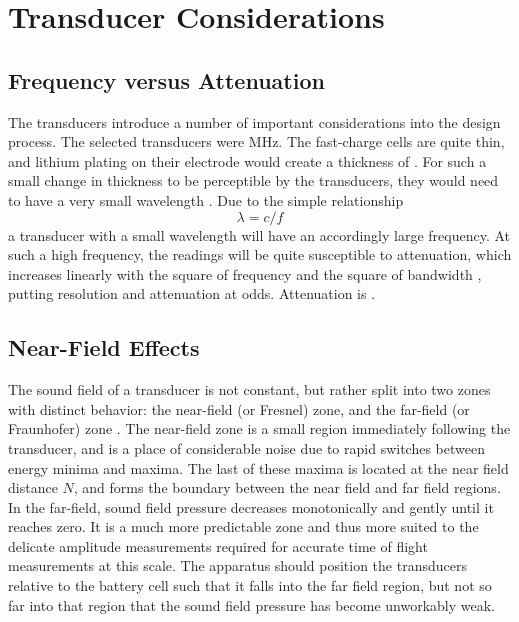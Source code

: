 \section{Transducer Considerations}
\subsection{Frequency versus Attenuation}
The transducers introduce a number of important considerations into the design process.
The selected transducers were  MHz. The fast-charge cells are quite thin, and lithium plating on their electrode would create a thickness of . 
For such a small change in thickness to be perceptible by the transducers, they would need to have a very small wavelength . Due to the simple relationship 
$$ \lambda = c/f$$
a transducer with a small wavelength will have an accordingly large frequency. At such a high frequency, the readings will be quite susceptible to attenuation, which increases linearly with the square of frequency and the square of bandwidth \cite{OLYMPUS}, putting resolution and attenuation at odds. Attenuation is .

\subsection{Near-Field Effects}
The sound field of a transducer is not constant, but rather split into two zones with distinct behavior: the near-field (or Fresnel) zone, and the far-field (or Fraunhofer) zone \cite{OLYMPUS}. 
The near-field zone is a small region immediately following the transducer, and is a place of considerable noise due to rapid switches between energy minima and maxima. 
The last of these maxima is located at the near field distance $N$, and forms the boundary between the near field and far field regions. \cite{OLYMPUS}
In the far-field, sound field pressure decreases monotonically and gently until it reaches zero. \cite{OLYMPUS}
It is a much more predictable zone and thus more suited to the delicate amplitude measurements required for accurate time of flight measurements at this scale.
The apparatus should position the transducers relative to the battery cell such that it falls into the far field region, but not so far into that region that the sound field pressure has become unworkably weak.

